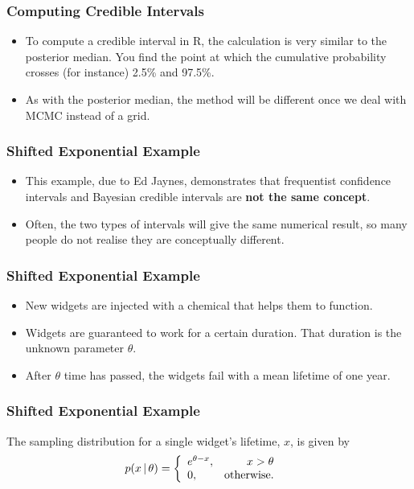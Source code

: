 \documentclass{beamer}
\newcommand{\given}{\,|\,}
\begin{document}
\begin{frame}[fragile]
\frametitle{Computing Credible Intervals}
\begin{itemize}
\item To compute a credible interval in R, the calculation is very similar to the
posterior median. You find the point at which the cumulative probability
crosses (for instance) 2.5\% and 97.5\%.\pause
\item As with the posterior median, the method will be different once we
deal with MCMC instead of a grid.
\end{itemize}

\end{frame}



\begin{frame}[fragile]
\frametitle{Shifted Exponential Example}
\begin{itemize}
\item This example, due to Ed Jaynes, demonstrates that frequentist confidence intervals
and Bayesian credible intervals are {\bf not the same concept}.\pause
\item Often, the two types of intervals will give the same numerical result, so
many people do not realise they are conceptually different.
\end{itemize}

\end{frame}

\begin{frame}[fragile]
\frametitle{Shifted Exponential Example}
\begin{itemize}
\item New widgets are injected with a chemical that helps
them to function.\pause
\item Widgets are guaranteed to work for a certain duration. That duration is the
unknown parameter $\theta$.\pause
\item After $\theta$ time has passed, the widgets fail with a mean lifetime
of one year.
\end{itemize}

\end{frame}


\begin{frame}[fragile]
\frametitle{Shifted Exponential Example}
The sampling distribution for a single widget's lifetime, $x$, is given by
\begin{align}
p(x \given \theta) &= \left\{
    \begin{array}{lr}
    e^{\theta - x}, & x > \theta \\
    0,              & \textnormal{otherwise.}
    \end{array}
    \right.
\end{align}

\end{frame}
\end{document}

